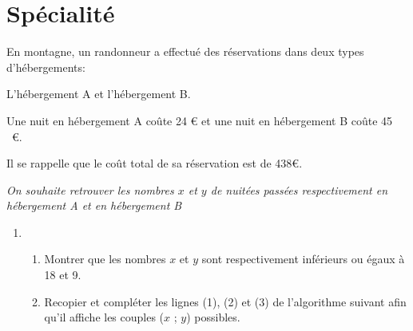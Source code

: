 \documentclass{cornouaille}
\begin{document}
\section{Spécialité}
\begin{exercice}[Spécialité][5]


En montagne, un randonneur a effectué des réservations dans deux types d'hébergements:

L'hébergement A et l'hébergement B.

Une nuit en hébergement A coûte 24 \euro{} et une nuit en  hébergement B coûte 45 ~\euro{}.

Il se rappelle que le coût  total de sa réservation est de 438\euro{}.
 
\emph{On souhaite retrouver les nombres $x$ et $y$ de nuitées passées respectivement en hébergement A et en  hébergement B}

\medskip
 
\begin{enumerate}
\item 
	\begin{enumerate}
		\item Montrer que les nombres $x$ et $y$ sont respectivement inférieurs ou égaux à 18 et 9.		
		\item Recopier et compléter les lignes (1), (2) et (3) de l'algorithme suivant afin qu'il affiche les couples ($x$ ; $y$) possibles.

\begin{center}
\end{center}



\end{enumerate}
\end{enumerate}
\end{exercice}
\end{document}
